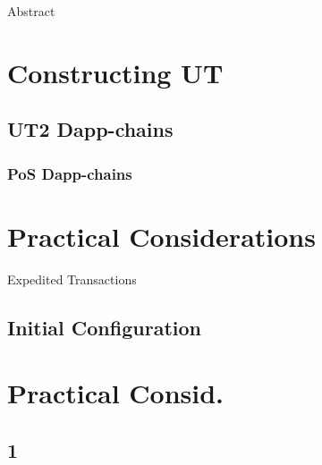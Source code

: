 \documentclass[a4paper]{article}
\begin{document}
\tableofcontents

\newpage

\begin{section}{Abstract}



\end{section}

\newpage

\section{Constructing UT}

\subsection{UT2 Dapp-chains}

\subsubsection{PoS Dapp-chains}




\newpage

\section{Practical Considerations}

\begin{subsection}{Expedited Transactions}

  

\end{subsection}



\subsection{Initial Configuration}

\label{sec:initial-config}




\section{Practical Consid.}

\subsection{1}
\end{document}
